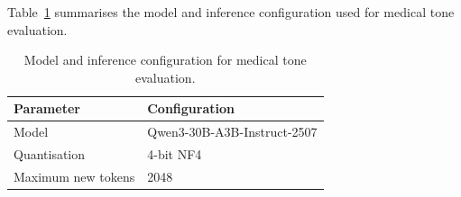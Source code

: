 \documentclass[ %
                    author={Aman Kumar Singh},
                supervisor={Dr. Edwin Simpson},
                    degree={MSc},
                     title={Quality-Aware Knowledge Distillation of Large Language Models for Efficient Personalised Clinical Report Generation},
                  subtitle={},
                      type={},
                      year={2021}]{dissertation}
\begin{document}
Table~\ref{tab:medical_tone_config} summarises the model and inference configuration used for medical tone evaluation.


\begin{table}[htbp]
\centering
\caption{Model and inference configuration for medical tone evaluation.}
\label{tab:medical_tone_config}
\begin{tabular}{ll}
\hline
\textbf{Parameter} & \textbf{Configuration} \\
\hline
Model & Qwen3-30B-A3B-Instruct-2507 \\
Quantisation & 4-bit NF4 \\

Maximum new tokens & 2048 \\

\hline
\end{tabular}
\end{table}
\end{document}
